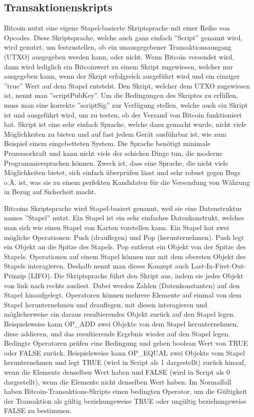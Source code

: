\subsection{Transaktionenskripts}
Bitcoin nutzt eine eigene Stapel-basierte Skriptsprache mit einer Reihe von Opcodes. Diese Skriptsprache, welche auch ganz 
einfach ''Script'' genannt wird, wird genutzt, um festzustellen, ob ein unausgegebener Transaktionsausgang (UTXO) ausgegeben 
werden kann, oder nicht. Wenn Bitcoin versendet wird,
dann wird lediglich ein Bitcoinwert zu einem Skript zugewiesen, welcher nur ausgegeben kann, wenn der Skript erfolgreich
ausgeführt wird und ein einziger ''true'' Wert auf dem Stapel entsteht. Den Skript, welcher dem UTXO zugewiesen ist, nennt man
''scriptPubKey''. Um die Bedingungen des Skriptes zu erfüllen, muss man eine korrekte ''scriptSig'' zur Verfügung stellen,
welche auch ein Skript ist und ausgeführt wird, um zu testen, ob der Versand von Bitcoin funktioniert hat.  
Skript ist eine sehr einfach Sprache, welche dazu gemacht wurde, nicht viele Möglichkeiten zu bieten und auf fast jedem
Gerät ausführbar ist, wie zum Beispiel einem eingebetteten System. Die Sprache benötigt minimale Prozessorkraft und kann nicht 
viele der schicken Dinge tun, die moderne Programmiersprachen können. Zweck ist, dass eine Sprache, die nicht viele Möglichkeiten
bietet, sich einfach überprüfen lässt und sehr robust gegen Bugs o.Ä. ist, was sie zu einem perfekten Kandidaten für die 
Versendung von Währung in Bezug auf Sicherheit macht.

Bitcoins Skriptsprache wird Stapel-basiert genannt, weil sie eine Datenstruktur names ''Stapel'' nutzt. Ein Stapel ist ein sehr
einfaches Datenkonstrukt, welches man sich wie einen Stapel von Karten vorstellen kann. Ein Stapel hat zwei mögliche Operationen:
Push (drauflegen) und Pop (herunternehmen). Push legt ein Objekt an die Spitze des Stapels. Pop entfernt ein Objekt von der
Spitze des Stapels. Operationen auf einem Stapel können nur mit dem obersten Objekt des Stapels interagieren. Deshalb nennt man
dieses Konzept auch Last-In-First-Out-Prinzip (LIFO). Die Skriptsprache führt den Skript aus, indem sie jedes Objekt von link
nach rechts ausliest. Dabei werden Zahlen (Datenkonstanten) auf den Stapel hinaufgelegt. Operatoren können mehrere Elemente auf
einmal von dem Stapel herunternehmen und drauflegen, mit diesen interagieren und möglicherweise ein daraus resultierendes Objekt
zurück auf den Stapel legen. Beispielsweise kann OP\_ADD zwei Objekte von dem Stapel herunternehmen, diese addieren, und das
resultierende Ergebnis wieder auf den Stapel legen.
Bedingte Operatoren prüfen eine Bedingung und geben boolean Wert von TRUE oder FALSE zurück. Beispielsweise kann OP\_EQUAL zwei
Objekte vom Stapel herunternehmen und legt TRUE (wird in Script als 1 dargestellt) zurück hinauf, wenn die Elemente denselben
Wert haben und FALSE (wird in Script als 0 dargestellt), wenn die Elemente nicht denselben Wert haben. Im Normalfall haben
Bitcoin-Transaktions-Skripts einen bedingten Operator, um die Gültigkeit der Transaktion als gültig beziehungsweise TRUE oder
ungültig beziehungsweise FALSE zu bestimmen. 

